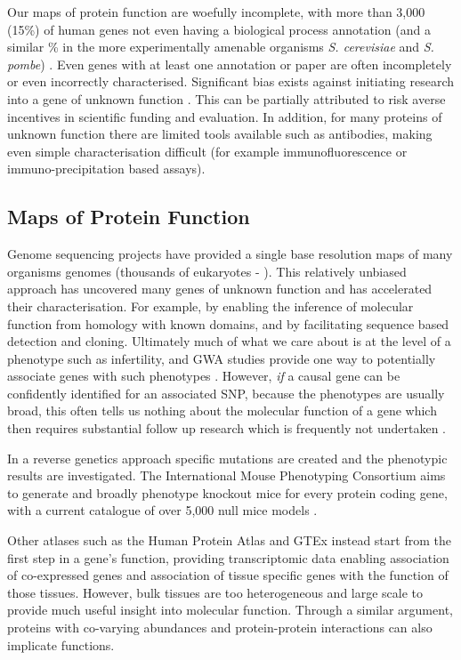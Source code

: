 Our maps of protein function are woefully incomplete, with more than 3,000 (15\%) of human genes not even having a biological process annotation (and a similar \% in the more experimentally amenable organisms \textit{S. cerevisiae} and \textit{S. pombe}) \parencite{Wood2019Hidden}. Even genes with at least one annotation or paper are often incompletely or even incorrectly characterised. Significant bias exists against initiating research into a gene of unknown function \parencite{Edwards2011Too, Stoeger2018Largescale, Haynes2018Gene}. This can be partially attributed to risk averse incentives in scientific funding and evaluation. In addition, for many proteins of unknown function there are limited tools available such as antibodies, making even simple characterisation difficult (for example immunofluorescence or immuno-precipitation based assays).


\subsection{Maps of Protein Function}
Genome sequencing projects have provided a single base resolution maps of many organisms genomes (thousands of eukaryotes - \cite{Genome}). This relatively unbiased approach has uncovered many genes of unknown function and has accelerated their characterisation. For example, by enabling the inference of molecular function from homology with known domains, and by facilitating sequence based detection and cloning. Ultimately much of what we care about is at the level of a phenotype such as infertility, and GWA studies provide one way to potentially associate genes with such phenotypes \parencite{Gajbhiye2018Complex}. However, \emph{if} a causal gene can be confidently identified for an associated SNP, because the phenotypes are usually broad, this often tells us nothing about the molecular function of a gene which then requires substantial follow up research which is frequently not undertaken \parencite{Visscher201710, Gallagher2018PostGWAS, Struck2018impact}.

In a reverse genetics approach specific mutations are created and the phenotypic results are investigated. The International Mouse Phenotyping Consortium aims to generate and broadly phenotype knockout mice for every protein coding gene, with a current catalogue of over 5,000 null mice models \parencite{2004Knockout,Meehan2017Disease, Birling2019resource}.

Other atlases such as the Human Protein Atlas and GTEx instead start from the first step in a gene's function, providing transcriptomic data enabling association of co-expressed genes and association of tissue specific genes with the function of those tissues. However, bulk tissues are too heterogeneous and large scale to provide much useful insight into molecular function. Through a similar argument, proteins with co-varying abundances and protein-protein interactions can also implicate functions.


